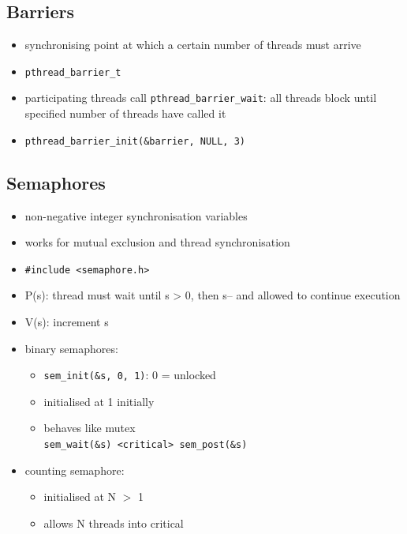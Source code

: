 \documentclass[10pt, multicolumn, a4paper]{article}
\begin{document}
\begin{multicols}{2}
	\subsection*{Barriers}
	\begin{itemize}
	\item synchronising point at which a certain number of threads must arrive 
	\item \verb|pthread_barrier_t|
	\item participating threads call \verb|pthread_barrier_wait|: all threads block until specified number of threads have called it
	\item \verb|pthread_barrier_init(&barrier, NULL, 3)|
	\end{itemize}
	\subsection*{Semaphores}
	\begin{itemize}
	\item non-negative integer synchronisation variables
	\item works for mutual exclusion and thread synchronisation
	\item \verb|#include <semaphore.h>|
	\item P(s): thread must wait until s > 0, then s-- and allowed to continue execution 
	\item V(s): increment s
	\item binary semaphores: 
		\begin{itemize}
		\item \verb|sem_init(&s, 0, 1)|: 0 = unlocked
		\item initialised at 1 initially
		\item behaves like mutex \\ \verb|sem_wait(&s) <critical> sem_post(&s)|
		\end{itemize}
	\item counting semaphore:
		\begin{itemize}
		\item initialised at N $>$ 1
		\item allows N threads into critical
		\end{itemize}
	\end{itemize}

\end{multicols}
\end{document}
